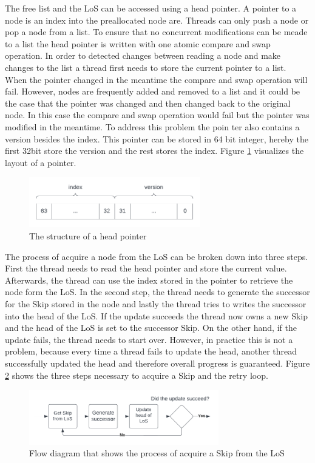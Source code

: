 \documentclass[sigconf,nonacm]{acmart}
\begin{document}
        The free list and the LoS can be accessed using a head pointer. A pointer to a node is an index into the preallocated node are. Threads can only push a node or pop a node from a list. To ensure that no concurrent modifications can be meade to a list the head pointer is written with one atomic compare and swap operation. In order to detected changes between reading a node and make changes to the list a thread first needs to store the current pointer to a list. When the pointer changed in the meantime the compare and swap operation will fail. However, nodes are frequently added and removed to a list and it could be the case that the pointer was changed and then changed back to the original node. In this case the compare and swap operation would fail but the pointer was modified in the meantime. To address this problem the poin
        ter also contains a version besides the index. This pointer can be stored in 64 bit integer, hereby the first 32bit store the version and the rest stores the index. Figure \ref{fig:pointer} visualizes the layout of a pointer.
        \begin{figure}[H]
            \includegraphics[height=2.2cm]{figure4.pdf}
            \caption{The structure of a head pointer}
            \label{fig:pointer}
        \end{figure}  

        The process of acquire a node from the LoS can be broken down into three steps. First the thread needs to read the head pointer and store the current value. Afterwards, the thread can use the index stored in the pointer to retrieve the node form the LoS. In the second step, the thread needs to generate the successor for the Skip stored in the node and lastly the thread tries to writes the successor into the head of the LoS. If the update succeeds the thread now owns a new Skip and the head of the LoS is set to the successor Skip. On the other hand, if the update fails, the thread needs to start over. However, in practice this is not a problem, because every time a thread fails to update the head, another thread successfully updated the head and therefore overall progress is guaranteed. Figure \ref{fig:acquire} shows the three steps necessary to acquire a Skip and the retry loop.
        \begin{figure}[H]
            \includegraphics[height=2.4cm]{figure5.pdf}
            \caption{Flow diagram that shows the process of acquire a Skip from the LoS}
            \label{fig:acquire}
        \end{figure}
\end{document}
